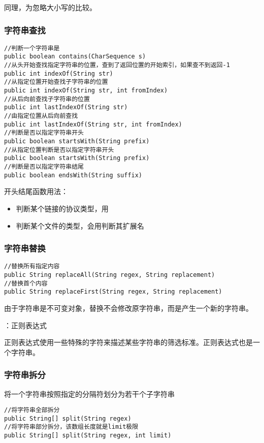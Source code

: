 \documentclass[a4paper]{report}
\begin{document}
同理，为忽略大小写的比较。
\subsubsection{字符串查找}
\begin{lstlisting}
//判断一个字符串是
public boolean contains(CharSequence s)
//从头开始查找指定字符串的位置，查到了返回位置的开始索引，如果查不到返回-1
public int indexOf(String str)
//从指定位置开始查找子字符串的位置
public int indexOf(String str, int fromIndex)
//从后向前查找子字符串的位置
public int lastIndexOf(String str)
//由指定位置从后向前查找
public int lastIndexOf(String str, int fromIndex)
//判断是否以指定字符串开头
public boolean startsWith(String prefix)
//从指定位置判断是否以指定字符串开头
public boolean startsWith(String prefix)
//判断是否以指定字符串结尾
public boolean endsWith(String suffix)
\end{lstlisting}

开头结尾函数用法：
\begin{itemize}
\itemsep=0pt \parskip =0pt
  \item 判断某个链接的协议类型，用
  \item 判断某个文件的类型，会用判断其扩展名
\end{itemize}
\subsubsection{字符串替换}
\begin{lstlisting}
//替换所有指定内容
public String replaceAll(String regex, String replacement)
//替换首个内容
public String replaceFirst(String regex, String replacement)
\end{lstlisting}
由于字符串是不可变对象，替换不会修改原字符串，而是产生一个新的字符串。

\begin{tips}
：正则表达式

正则表达式使用一些特殊的字符来描述某些字符串的筛选标准。正则表达式也是一个字符串。
\end{tips}

\subsubsection{字符串拆分}
将一个字符串按照指定的分隔符划分为若干个子字符串
\begin{lstlisting}
//将字符串全部拆分
public String[] split(String regex)
//将字符串部分拆分，该数组长度就是limit极限
public String[] split(String regex, int limit)
\end{lstlisting}
\end{document}
